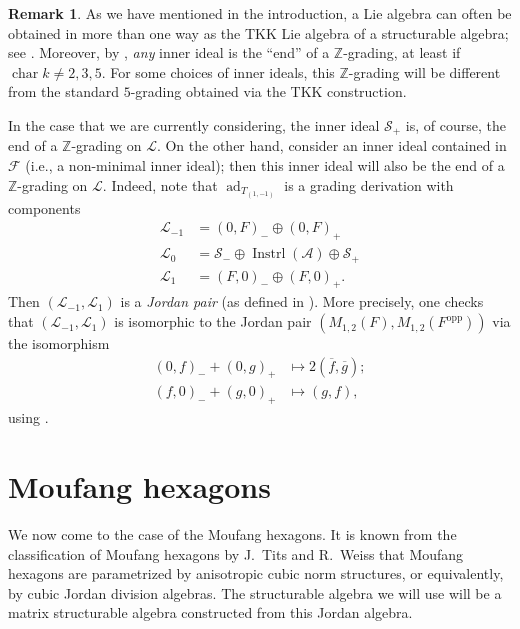 \documentclass[oneside,a4paper]{amsart} %
\theoremstyle{definition}
\newtheorem{remark}[theorem]{Remark}
\DeclareMathOperator{\Inst}{Instrl}
\DeclareMathOperator{\ad}{ad}
\DeclareMathOperator{\Char}{char}
\newcommand{\A}{\mathcal{A}}
\renewcommand{\SS}{\mathcal{S}}
\newcommand{\LL}{\mathcal{L}}
\newcommand{\F}{\mathcal{F}}
\numberwithin{equation}{section}
\begin{document}
\begin{remark}
\label{Triangle other grading}
    As we have mentioned in the introduction, a Lie algebra can often be obtained in more than one way as the TKK Lie algebra of a structurable algebra; see \cite[Theorem 5.9]{Stavrova2017}.
    Moreover, by \cite[5.2]{Lopez2007}, \textit{any} inner ideal is the ``end'' of a $\mathbb Z$-grading, at least if $\Char k \neq 2,3,5$.
    For some choices of inner ideals, this $\mathbb Z$-grading will be different from the standard $5$-grading obtained via the TKK construction.

	In the case that we are currently considering, the inner ideal $\SS_+$ is, of course, the end of a $\mathbb Z$-grading on $\LL$.
	On the other hand, consider an inner ideal contained in $\F$ (i.e., a non-minimal inner ideal); then this inner ideal will also be the end of a $\mathbb Z$-grading on $\LL$.
	Indeed, note that $\ad_{T_{(1,-1)}}$ is a grading derivation with components
	\begin{align*} 
		\LL_{-1}&=(0,F)_-\oplus (0,F)_+ \\
		\LL_0&=\SS_-\oplus\Inst(\A)\oplus \SS_+ \\
		\LL_1&=(F,0)_-\oplus (F,0)_+.
	\end{align*}
	Then $(\LL_{-1},\LL_1)$ is a \textit{Jordan pair} (as defined in \cite[1.2]{Loos1975}).
	More precisely, one checks that $(\LL_{-1},\LL_1)$ is isomorphic to the Jordan pair $(M_{1,2}(F),M_{1,2}(F^{\operatorname{opp}} ))$ via the isomorphism 
	\begin{align*} 
		(0,f)_-+(0,g)_+&\mapsto 2 (\overline f, \overline g);\\
		(f,0)_-+(g,0)_+&\mapsto  (g,f),
	\end{align*}
	using \cite[8.15]{Loos1975}.
\end{remark}



\section{Moufang hexagons}
\label{sec 7}

We now come to the case of the Moufang hexagons.
It is known from the classification of Moufang hexagons by J.~Tits and R.~Weiss \cite{Tits2002} that Moufang hexagons are parametrized by anisotropic cubic norm structures, or equivalently, by cubic Jordan division algebras. The structurable algebra we will use will be a matrix structurable algebra constructed from this Jordan algebra.
\end{document}
